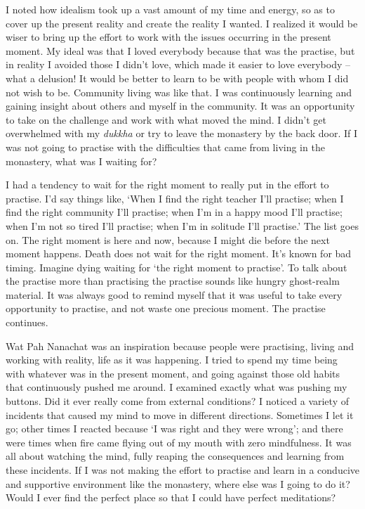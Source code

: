 I noted how idealism took up a vast amount of my time and energy, so as
to cover up the present reality and create the reality I wanted. I
realized it would be wiser to bring up the effort to work with the
issues occurring in the present moment. My ideal was that I loved
everybody because that was the practise, but in reality I avoided those
I didn't love, which made it easier to love everybody -- what a delusion! 
It would be better to learn to be with people with whom I did not wish
to be. Community living was like that. I was continuously learning and
gaining insight about others and myself in the community. It was an
opportunity to take on the challenge and work with what moved the mind. 
I didn't get overwhelmed with my \emph{dukkha} or try to leave the
monastery by the back door. If I was not going to practise with the
difficulties that came from living in the monastery, what was I waiting
for?

I had a tendency to wait for the right moment to really put in the
effort to practise. I'd say things like, `When I find the right teacher
I'll practise; when I find the right community I'll practise; when I'm
in a happy mood I'll practise; when I'm not so tired I'll practise; when
I'm in solitude I'll practise.' The list goes on. The right moment is
here and now, because I might die before the next moment happens. Death
does not wait for the right moment. It's known for bad timing. Imagine
dying waiting for `the right moment to practise'. To talk about the
practise more than practising the practise sounds like hungry
ghost-realm material. It was always good to remind myself that it was
useful to take every opportunity to practise, and not waste one precious
moment. The practise continues. 

Wat Pah Nanachat was an inspiration because people were practising, 
living and working with reality, life as it was happening. I tried to
spend my time being with whatever was in the present moment, and going
against those old habits that continuously pushed me around. I examined
exactly what was pushing my buttons. Did it ever really come from
external conditions? I noticed a variety of incidents that caused my
mind to move in different directions. Sometimes I let it go; other times
I reacted because `I was right and they were wrong'; and there were
times when fire came flying out of my mouth with zero mindfulness. It
was all about watching the mind, fully reaping the consequences and
learning from these incidents. If I was not making the effort to
practise and learn in a conducive and supportive environment like the
monastery, where else was I going to do it? Would I ever find the
perfect place so that I could have perfect meditations? 

